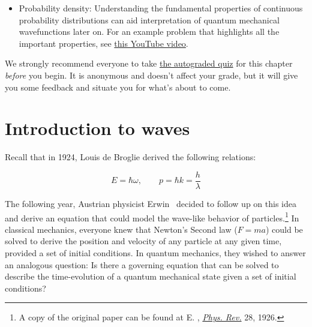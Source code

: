 \begin{itemize}
	\item Probability density: Understanding the fundamental properties of continuous probability distributions can aid interpretation of quantum mechanical wavefunctions later on.
	For an example problem that highlights all the important properties, see \href{https://www.youtube.com/watch?v=QKA4HNEw3aY}{this YouTube video}.
\end{itemize}

\begin{tcolorbox}[colframe=PaloAlto, colbacktitle=PaloAlto!20!white, title=Pre-check quiz]
	We strongly recommend everyone to take \href{https://forms.gle/3HcR81RWdTTRJXzGA}{the autograded quiz} for this chapter \emph{before} you begin.
	It is anonymous and doesn't affect your grade, but it will give you some feedback and situate you for what's about to come.
\end{tcolorbox}


\section{Introduction to waves}

Recall that in 1924, Louis de Broglie derived the following relations:

\begin{tcolorbox}[title=de Broglie relations] \vspace{-2ex}
	\begin{equation*}
		E=\hbar\omega, \qquad p = \hbar k = \frac{h}{\lambda}
	\end{equation*}
\end{tcolorbox}

The following year, Austrian physicist Erwin \Sch\ decided to follow up on this idea and derive an equation that could model the wave-like behavior of particles.\footnote{A copy of the original paper can be found at E. \Sch, \href{https://journals.aps.org/pr/abstract/10.1103/PhysRev.28.1049}{\emph{Phys. Rev.}} 28, 1926.} 
In classical mechanics, everyone knew that Newton's Second law ($F=ma$) could be solved to derive the position and velocity of any particle at any given time, provided a set of initial conditions. 
In quantum mechanics, they wished to answer an analogous question: Is there a governing equation that can be solved to describe the time-evolution of a quantum mechanical state given a set of initial conditions? 

